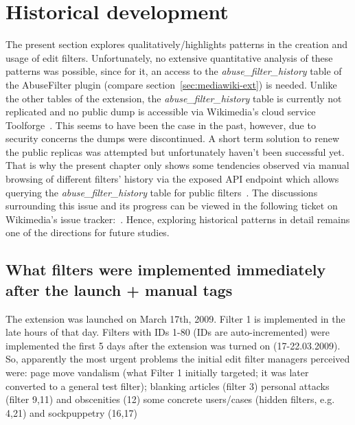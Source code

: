 

\section{Historical development}
\label{sec:5-history}

The present section explores qualitatively/highlights patterns in the creation and usage of edit filters.
Unfortunately, no extensive quantitative analysis of these patterns was possible, since for it, an access to the \emph{abuse\_filter\_history} table of the AbuseFilter plugin (compare section~\ref{sec:mediawiki-ext}) is needed.
Unlike the other tables of the extension, the \emph{abuse\_filter\_history} table is currently not replicated and no public dump is accessible via Wikimedia's cloud service Toolforge~\cite{Wikimedia:Toolforge}.
This seems to have been the case in the past, however, due to security concerns the dumps were discontinued.
A short term solution to renew the public replicas was attempted but unfortunately haven't been successful yet.
That is why the present chapter only shows some tendencies observed via manual browsing of different filters' history via the exposed API endpoint which allows querying the \emph{abuse\_filter\_history} table for public filters~\cite{Wikipedia:AbuseFilterHistory}.
The discussions surrounding this issue and its progress can be viewed in the following ticket on Wikimedia's issue tracker:~\cite{phabricator}.
Hence, exploring historical patterns in detail remains one of the directions for future studies.

\subsection{What filters were implemented immediately after the launch + manual tags}
The extension was launched on March 17th, 2009.
Filter 1 is implemented in the late hours of that day.
Filters with IDs 1-80 (IDs are auto-incremented) were implemented the first 5 days after the extension was turned on (17-22.03.2009).
So, apparently the most urgent problems the initial edit filter managers perceived were:
page move vandalism (what Filter 1 initially targeted; it was later converted to a general test filter);
blanking articles (filter 3)
personal attacks (filter 9,11) and obscenities (12)
some concrete users/cases (hidden filters, e.g. 4,21) and sockpuppetry (16,17)

